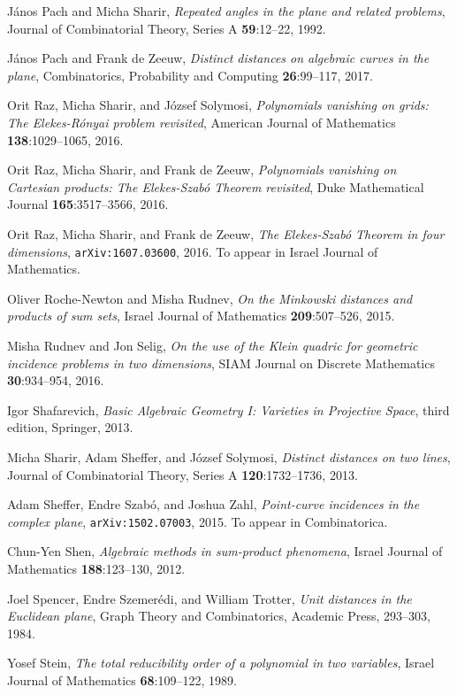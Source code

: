 \documentclass{daj}
\theoremstyle{definition}
\begin{document}
\begin{thebibliography}{99}
J\'anos Pach and Micha Sharir,
\emph{Repeated angles in the plane and related problems},
Journal of Combinatorial Theory, Series A 
{\bf 59}:12--22, 1992.

J\'anos Pach and Frank de Zeeuw,
\emph{Distinct distances on algebraic curves in the plane},
Combinatorics, Probability and Computing {\bf 26}:99--117, 2017.

Orit Raz, Micha Sharir, and J\'ozsef Solymosi,
\emph{Polynomials vanishing on grids: The Elekes-R\'onyai problem revisited},
American Journal of Mathematics 
{\bf 138}:1029--1065, 2016.

Orit Raz, Micha Sharir, and Frank de Zeeuw,
\emph{Polynomials vanishing on Cartesian products: The Elekes-Szab\'o Theorem revisited},
Duke Mathematical Journal {\bf 165}:3517--3566, 2016.

Orit Raz, Micha Sharir, and Frank de Zeeuw,
\emph{The Elekes-Szab\'o Theorem in four dimensions},
{\tt arXiv:1607.03600}, 2016.
To appear in Israel Journal of Mathematics.

Oliver Roche-Newton and Misha Rudnev,
\emph{On the Minkowski distances and products of sum sets},
Israel Journal of Mathematics 
{\bf 209}:507--526, 2015.

Misha Rudnev and Jon Selig,
\emph{On the use of the Klein quadric for geometric incidence problems in two dimensions},
SIAM Journal on Discrete Mathematics 
{\bf 30}:934--954, 2016.

Igor Shafarevich,
\emph{Basic Algebraic Geometry I: Varieties in Projective Space},
third edition, Springer, 2013.

Micha Sharir, Adam Sheffer, and J\'ozsef Solymosi,
\emph{Distinct distances on two lines},
Journal of Combinatorial Theory, Series A 
{\bf 120}:1732--1736, 2013.

Adam Sheffer, Endre Szab\'o, and Joshua Zahl,
\emph{Point-curve incidences in the complex plane},
{\tt arXiv:1502.07003}, 2015.
To appear in Combinatorica.

Chun-Yen Shen,
\emph{Algebraic methods in sum-product phenomena},
Israel Journal of Mathematics {\bf 188}:123--130, 2012.

Joel Spencer, Endre Szemer\'edi, and William Trotter,
\emph{Unit distances in the Euclidean plane},
Graph Theory and Combinatorics, Academic Press, 293--303, 1984.

Yosef Stein, 
\emph{The total reducibility order of a polynomial in two variables}, 
Israel Journal of Mathematics 
\textbf{68}:109--122, 1989.


\end{thebibliography}
\end{document}
